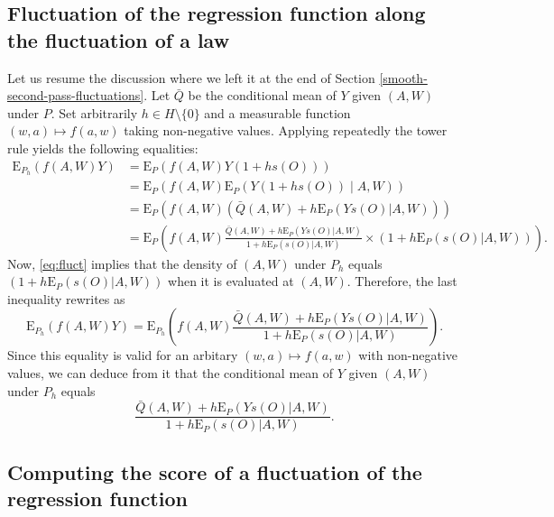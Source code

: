 \documentclass[
  11pt,
  openright,twoside]{book}
\newcommand{\Exp}{\textrm{E}}
\newcommand{\Qbar}{\bar{Q}}
\theoremstyle{definition}
\theoremstyle{definition}
\theoremstyle{definition}
\theoremstyle{definition}
\theoremstyle{remark}
\begin{document}
\hypertarget{fluct-reg}{%
\subsection{Fluctuation of the regression function along the fluctuation of a law}\label{fluct-reg}}

Let us resume the discussion where we left it at the end of Section
\ref{smooth-second-pass-fluctuations}. Let \(\Qbar\) be the conditional mean
of \(Y\) given \((A,W)\) under \(P\). Set arbitrarily \(h \in H \setminus \{0\}\) and
a measurable function \((w,a) \mapsto f(a,w)\) taking non-negative
values. Applying repeatedly the tower rule yields the following equalities:
\begin{align*} \Exp_{P_{h}}  \left(f(A,W) Y\right) &= \Exp_{P}  \left(f(A,W) Y
(1 + h  s(O))\right) \\ &= \Exp_{P} \left(f(A,W) \Exp_{P}\left(Y  (1 + h s(O))
\middle|A,W\right)\right)  \\ &=  \Exp_{P} \left(f(A,W)  \left(\Qbar(A,W) +  h
\Exp_{P}(Ys(O)   |   A,W)   \right)\right)   \\   &=   \Exp_{P}   \left(f(A,W)
\frac{\Qbar(A,W) + h  \Exp_{P}(Ys(O) | A,W)}{1 +  h \Exp_{P}(s(O)|A,W)} \times
\left(1 + h \Exp_{P}(s(O)|A,W)\right)\right).\end{align*} Now, \eqref{eq:fluct}
implies that the density of \((A,W)\) under \(P_{h}\) equals \(\left(1 + h \Exp_{P}(s(O)|A,W)\right)\) when it is evaluated at \((A,W)\). Therefore, the
last inequality rewrites as
\begin{equation*} 
\Exp_{P_{h}}  \left(f(A,W)
Y\right)  = \Exp_{P_{h}}  \left(f(A,W) \frac{\Qbar(A,W)  + h  \Exp_{P}(Ys(O) |
A,W)}{1 + h \Exp_{P}(s(O)|A,W)}\right).
\end{equation*}
Since this equality is valid
for an arbitary \((w,a) \mapsto f(a,w)\) with non-negative values, we can deduce
from it that the conditional mean of \(Y\) given \((A,W)\) under \(P_h\) equals
\begin{equation*}\frac{\Qbar(A,W)   +  h   \Exp_{P}(Ys(O)   |   A,W)}{1  +   h
\Exp_{P}(s(O)|A,W)}.\end{equation*}

\hypertarget{fluct-score}{%
\subsection{Computing the score of a fluctuation of the regression function}\label{fluct-score}}
\end{document}
